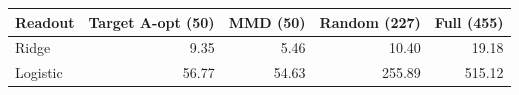 \begin{tabular}{lrrrr}
\toprule
Readout & Target A-opt (50) & MMD (50) & Random (227) & Full (455)\\
\midrule
Ridge & 9.35 & 5.46 & 10.40 & 19.18\\
Logistic & 56.77 & 54.63 & 255.89 & 515.12\\
\bottomrule
\end{tabular}
